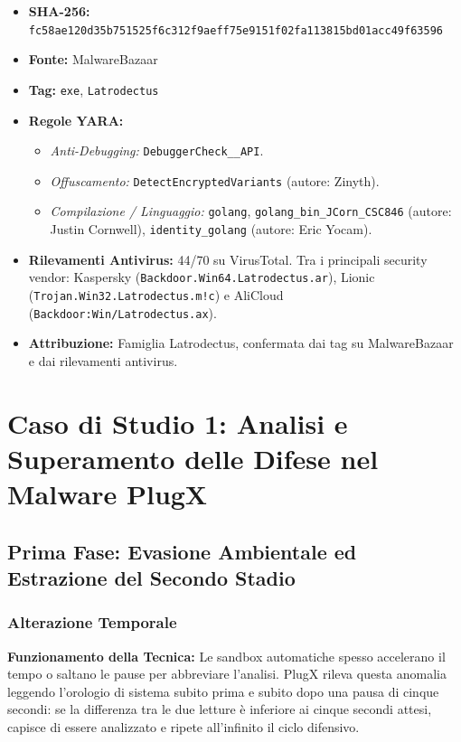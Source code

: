 \documentclass[11pt, a4paper]{article}
\begin{document}
	\begin{itemize}
		\item \textbf{SHA-256:} {\small\texttt{fc58ae120d35b751525f6c312f9aeff75e9151f02fa113815bd01acc49f63596}}
		\item \textbf{Fonte:} MalwareBazaar
		\item \textbf{Tag:} \texttt{exe}, \texttt{Latrodectus}
		\item \textbf{Regole YARA:}
		\begin{itemize}
			\item \textit{Anti-Debugging:} \texttt{DebuggerCheck\_\_API}.
			\item \textit{Offuscamento:} \texttt{DetectEncryptedVariants} (autore: Zinyth).
			\item \textit{Compilazione / Linguaggio:} \texttt{golang}, \texttt{golang\_bin\_JCorn\_CSC846} (autore: Justin Cornwell), \texttt{identity\_golang} (autore: Eric Yocam).
		\end{itemize}
		\item \textbf{Rilevamenti Antivirus:} 44/70 su VirusTotal. Tra i principali security vendor: Kaspersky (\texttt{Backdoor.Win64.Latrodectus.ar}), Lionic (\texttt{Trojan.Win32.Latrodectus.m!c}) e AliCloud (\texttt{Backdoor:Win/Latrodectus.ax}).
		\item \textbf{Attribuzione:} Famiglia Latrodectus, confermata dai tag su MalwareBazaar e dai rilevamenti antivirus.
	\end{itemize}
	
	\section{Caso di Studio 1: Analisi e Superamento delle Difese nel Malware PlugX}
	
	\subsection{Prima Fase: Evasione Ambientale ed Estrazione del Secondo Stadio}
	
	\subsubsection{Alterazione Temporale}
	
	\textbf{Funzionamento della Tecnica:} Le sandbox automatiche spesso accelerano il tempo o saltano le pause per abbreviare l'analisi. PlugX rileva questa anomalia leggendo l'orologio di sistema subito prima e subito dopo una pausa di cinque secondi: se la differenza tra le due letture è inferiore ai cinque secondi attesi, capisce di essere analizzato e ripete all'infinito il ciclo difensivo.
	
\end{document}
